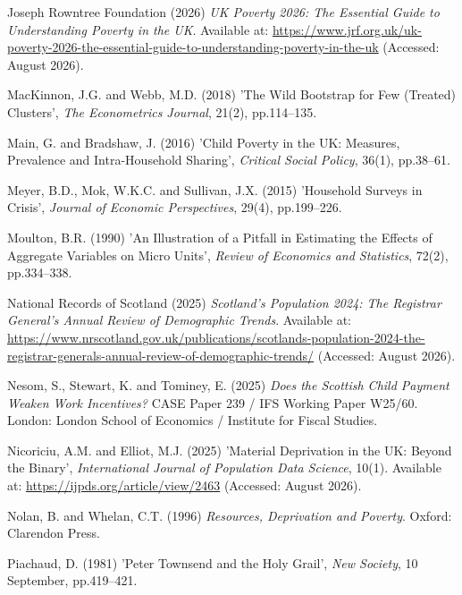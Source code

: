 \noindent\hangindent=1.27cm Joseph Rowntree Foundation (2026) \textit{UK Poverty 2026: The Essential Guide to Understanding Poverty in the UK}. Available at: \url{https://www.jrf.org.uk/uk-poverty-2026-the-essential-guide-to-understanding-poverty-in-the-uk} (Accessed: August 2026).
\medskip

\noindent\hangindent=1.27cm MacKinnon, J.G. and Webb, M.D. (2018) 'The Wild Bootstrap for Few (Treated) Clusters', \textit{The Econometrics Journal}, 21(2), pp.114--135.
\medskip

\noindent\hangindent=1.27cm Main, G. and Bradshaw, J. (2016) 'Child Poverty in the UK: Measures, Prevalence and Intra-Household Sharing', \textit{Critical Social Policy}, 36(1), pp.38--61.
\medskip

\noindent\hangindent=1.27cm Meyer, B.D., Mok, W.K.C. and Sullivan, J.X. (2015) 'Household Surveys in Crisis', \textit{Journal of Economic Perspectives}, 29(4), pp.199--226.
\medskip

\noindent\hangindent=1.27cm Moulton, B.R. (1990) 'An Illustration of a Pitfall in Estimating the Effects of Aggregate Variables on Micro Units', \textit{Review of Economics and Statistics}, 72(2), pp.334--338.
\medskip

\noindent\hangindent=1.27cm National Records of Scotland (2025) \textit{Scotland's Population 2024: The Registrar General's Annual Review of Demographic Trends}. Available at: \url{https://www.nrscotland.gov.uk/publications/scotlands-population-2024-the-registrar-generals-annual-review-of-demographic-trends/} (Accessed: August 2026).
\medskip

\noindent\hangindent=1.27cm Nesom, S., Stewart, K. and Tominey, E. (2025) \textit{Does the Scottish Child Payment Weaken Work Incentives?} CASE Paper 239 / IFS Working Paper W25/60. London: London School of Economics / Institute for Fiscal Studies.
\medskip

\noindent\hangindent=1.27cm Nicoriciu, A.M. and Elliot, M.J. (2025) 'Material Deprivation in the UK: Beyond the Binary', \textit{International Journal of Population Data Science}, 10(1). Available at: \url{https://ijpds.org/article/view/2463} (Accessed: August 2026).
\medskip

\noindent\hangindent=1.27cm Nolan, B. and Whelan, C.T. (1996) \textit{Resources, Deprivation and Poverty}. Oxford: Clarendon Press.
\medskip

\noindent\hangindent=1.27cm Piachaud, D. (1981) 'Peter Townsend and the Holy Grail', \textit{New Society}, 10 September, pp.419--421.
\medskip

